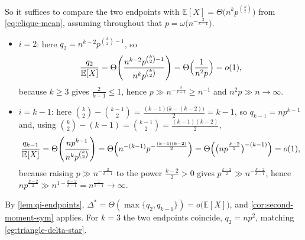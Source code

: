 \begin{center}
\end{center}

So it suffices to compare the two endpoints with \(\mathbb{E}[X] = \Theta\bigl( n^{k} p^{\binom{k}{2}} \bigr)\) from \eqref{eq:clique-mean}, assuming throughout that \(p = \omega\bigl( n^{-\frac{2}{k-1}} \bigr)\).
\begin{itemize}
    \item \(i = 2\): here \(q_2 = n^{k-2} p^{\binom{k}{2} - 1}\), so
    \[
        \frac{q_2}{\mathbb{E}[X]} = \Theta\Biggl( \frac{n^{k-2} p^{\binom{k}{2} - 1}}{n^{k} p^{\binom{k}{2}}} \Biggr) = \Theta\Bigl( \frac{1}{n^{2}p} \Bigr) = o(1),
    \]
    because \(k \ge 3\) gives \(\frac{2}{k-1} \le 1\), hence \(p \gg n^{-\frac{2}{k-1}} \ge n^{-1}\) and \(n^{2}p \gg n \to \infty\).
    \item \(i = k-1\): here \(\binom{k}{2} - \binom{k-1}{2} = \frac{(k-1)\bigl(k - (k-2)\bigr)}{2} = k-1\), so \(q_{k-1} = np^{k-1}\) and, using \(\binom{k}{2} - (k-1) = \binom{k-1}{2} = \frac{(k-1)(k-2)}{2}\),
    \[
        \frac{q_{k-1}}{\mathbb{E}[X]} = \Theta\Biggl( \frac{np^{k-1}}{n^{k} p^{\binom{k}{2}}} \Biggr)
        = \Theta\Bigl( n^{-(k-1)} p^{-\frac{(k-1)(k-2)}{2}} \Bigr)
        = \Theta\Bigl( \bigl( np^{\frac{k-2}{2}} \bigr)^{-(k-1)} \Bigr) = o(1),
    \]
    because raising \(p \gg n^{-\frac{2}{k-1}}\) to the power \(\frac{k-2}{2} > 0\) gives \(p^{\frac{k-2}{2}} \gg n^{-\frac{k-2}{k-1}}\), hence \(np^{\frac{k-2}{2}} \gg n^{1 - \frac{k-2}{k-1}} = n^{\frac{1}{k-1}} \to \infty\).
\end{itemize}
By \autoref{lem:qi-endpoints}, \(\Delta^{*} = \Theta(\max\{q_2, q_{k-1}\}) = o\bigl( \mathbb{E}[X] \bigr)\), and \autoref{cor:second-moment-sym} applies. For \(k = 3\) the two endpoints coincide, \(q_2 = np^{2}\), matching \autoref{eg:triangle-delta-star}.

